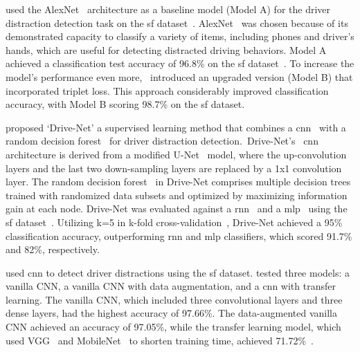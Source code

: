 \citet{mim_55_alexnet_okon2017detecting} used the AlexNet~\citep{Alexnet_krizhevsky2012imagenet} architecture as a baseline model (Model A) for the driver distraction detection task on the \gls{sf} dataset~\citep{statefarm2016}. AlexNet~\citep{Alexnet_krizhevsky2012imagenet}  was chosen because of its demonstrated capacity to classify a variety of items, including phones and driver's hands, which are useful for detecting distracted driving behaviors. Model A achieved a classification test accuracy of 96.8\% on the \gls{sf} dataset~\citep{statefarm2016}. To increase the model's performance even more,~\citet{mim_55_alexnet_okon2017detecting} introduced an upgraded version (Model B) that incorporated triplet loss. This approach considerably improved classification accuracy, with Model B scoring 98.7\% on the \gls{sf} dataset\citep{mim_55_alexnet_okon2017detecting}.

\citet{59_MIM_Sup_majdi2018drive} proposed `Drive-Net' a supervised learning method that combines a \gls{cnn}~\citep{CNN_o2015introduction} with a random decision forest~\citep{Random_decision_forest_ho1995random} for driver distraction detection.~Drive-Net's~\citep{59_MIM_Sup_majdi2018drive} \gls{cnn} architecture is derived from a modified U-Net~\citep{U_net_ronneberger2015u} model, where the up-convolution layers and the last two down-sampling layers are replaced by a 1x1 convolution layer. The random decision forest~\citep{Random_forest_ferns_bosch2007image} in Drive-Net comprises multiple decision trees trained with randomized data subsets and optimized by maximizing information gain at each node. Drive-Net was evaluated against a \gls{rnn}~\citep{RNN_Used_Object_Rec_liang2015recurrent} and a \gls{mlp}~\citep{MLP_classifier_haykin2009neural} using the \gls{sf} dataset~\citep{statefarm2016}. Utilizing k=5 in k-fold cross-validation~\citep{cross_val_hastie2009elements}, Drive-Net achieved a 95\% classification accuracy, outperforming \gls{rnn} and \gls{mlp} classifiers, which scored 91.7\% and 82\%, respectively\citep{59_MIM_Sup_majdi2018drive}.

\citet{60_MIM_Sup_janet2020real} used \gls{cnn} to detect driver distractions using the \gls{sf} dataset. \citet{60_MIM_Sup_janet2020real} tested three models: a vanilla CNN, a vanilla CNN with data augmentation, and a \gls{cnn} with transfer learning. The vanilla CNN, which included three convolutional layers and three dense layers, had the highest accuracy of 97.66\%. The data-augmented vanilla CNN achieved an accuracy of 97.05\%, while the transfer learning model, which used VGG~\citep{VGG_16_simonyan2014very} and MobileNet~\citep{MobileNet_howard2017mobilenets} to shorten training time, achieved 71.72\%~\citep{60_MIM_Sup_janet2020real}.

